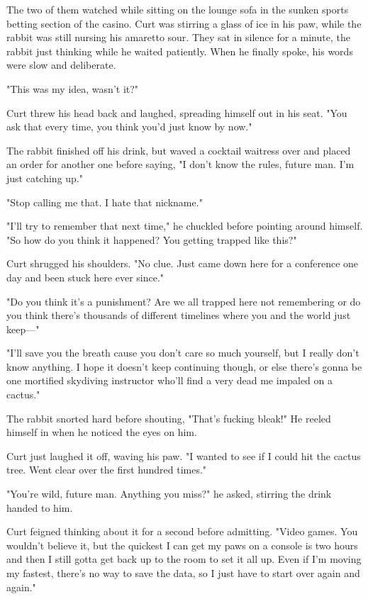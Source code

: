 The two of them watched while sitting on the lounge sofa in the sunken sports betting section of the casino. Curt was stirring a glass of ice in his paw, while the rabbit was still nursing his amaretto sour. They sat in silence for a minute, the rabbit just thinking while he waited patiently. When he finally spoke, his words were slow and deliberate.

"This was my idea, wasn't it?"

Curt threw his head back and laughed, spreading himself out in his seat. "You ask that every time, you think you'd just know by now."

The rabbit finished off his drink, but waved a cocktail waitress over and placed an order for another one before saying, "I don't know the rules, future man. I'm just catching up."

"Stop calling me that. I hate that nickname."

"I'll try to remember that next time," he chuckled before pointing around himself. "So how do you think it happened? You getting trapped like this?"

Curt shrugged his shoulders. "No clue. Just came down here for a conference one day and been stuck here ever since."

"Do you think it's a punishment? Are we all trapped here not remembering or do you think there's thousands of different timelines where you and the world just keep---"

"I'll save you the breath cause you don't care so much yourself, but I really don't know anything. I hope it doesn't keep continuing though, or else there's gonna be one mortified skydiving instructor who'll find a very dead me impaled on a cactus."

The rabbit snorted hard before shouting, "That's fucking bleak!" He reeled himself in when he noticed the eyes on him.

Curt just laughed it off, waving his paw. "I wanted to see if I could hit the cactus tree. Went clear over the first hundred times."

"You're wild, future man. Anything you miss?" he asked, stirring the drink handed to him.

Curt feigned thinking about it for a second before admitting. "Video games. You wouldn't believe it, but the quickest I can get my paws on a console is two hours and then I still gotta get back up to the room to set it all up. Even if I'm moving my fastest, there's no way to save the data, so I just have to start over again and again."

